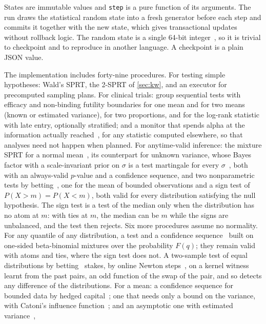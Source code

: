 \documentclass[11pt,a4paper]{article}
\theoremstyle{definition}
\theoremstyle{remark}
\newcommand{\code}[1]{\texttt{#1}}
\begin{document}
States are immutable values and \code{step} is a pure function of its
arguments. The run draws the statistical random state into a fresh
generator before each step and commits it together with the new state,
which gives transactional updates without rollback logic. The random
state is a single 64-bit integer~\cite{steele2014}, so it is trivial to
checkpoint and to reproduce in another language. A checkpoint is a
plain JSON value.

The implementation includes forty-nine procedures. For testing simple
hypotheses: Wald's SPRT, the 2-SPRT of \cref{sec:kw}, and an executor for
precomputed sampling plans. For clinical trials: group sequential
tests with efficacy and non-binding futility boundaries for one mean and
for two means (known or estimated variance), for two proportions, and
for the log-rank statistic with late entry, optionally stratified; and a
monitor that spends alpha at the information actually
reached~\cite{lan1983}, for any statistic computed elsewhere, so that
analyses need not happen when planned. For anytime-valid inference: the mixture SPRT for a
normal mean~\cite{robbins1970,johari2022}, its counterpart for unknown
variance, whose Bayes factor with a scale-invariant prior on $\sigma$ is
a test martingale for every $\sigma$~\cite{lai1976,perezortiz2024}, both
with an always-valid $p$-value and a confidence sequence, and two
nonparametric
tests by betting~\cite{shafer2021,waudbysmith2024,ramdas2023}, one for the
mean of bounded observations and a sign test of
$P(X>m)=P(X<m)$, both valid for every distribution satisfying the null
hypothesis. The sign test is a test of the median only when the
distribution has no atom at $m$: with ties at $m$, the median can be
$m$ while the signs are unbalanced, and the test then rejects. Six more
procedures assume no normality. For any quantile of any distribution, a
test and a confidence sequence~\cite{howard2022} built on one-sided
beta-binomial mixtures over the probability $F(q)$; they remain valid with
atoms and ties, where the sign test does not. A two-sample test of equal
distributions by betting~\cite{shekhar2024} stakes, by online Newton
steps~\cite{cutkosky2018}, on a kernel witness learnt from the past pairs,
an odd function of the swap of the pair, and so detects any difference of
the distributions. For a mean: a confidence sequence for bounded data by
hedged capital~\cite{waudbysmith2024}; one that needs only a bound on the
variance, with Catoni's influence function~\cite{catoni2012,wang2023}; and
an asymptotic one with estimated variance~\cite{waudbysmith2024asymptotic},
\end{document}
